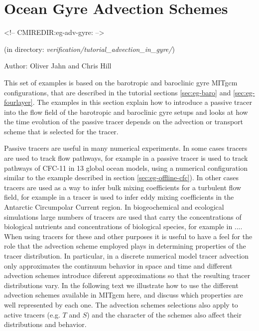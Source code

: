 


\section[Gyre Advection Example]{Ocean Gyre Advection Schemes}
\label{sec:eg-adv-gyre}
\begin{rawhtml}
<!-- CMIREDIR:eg-adv-gyre: -->
\end{rawhtml}
\begin{center} 
(in directory: {\it verification/tutorial\_advection\_in\_gyre/})
\end{center}

Author: Oliver Jahn and Chris Hill



This set of examples is based on the barotropic and baroclinic gyre MITgcm configurations,
that are described in the tutorial sections \ref{sec:eg-baro} and \ref{sec:eg-fourlayer}. 
The examples in this section explain how to introduce a passive tracer into the flow 
field of the barotropic and baroclinic gyre setups and looks at how the time evolution
of the passive tracer depends on the advection or transport scheme that is selected 
for the tracer. 

Passive tracers are useful in many numerical experiments. In some cases tracers are
used to track flow pathways, for example in \cite{Dutay02} a passive tracer is used
to track pathways of CFC-11 in 13 global ocean models, using a numerical
configuration similar to the example described in section \ref{sec:eg-offline-cfc}).
In other cases tracers are used as a way
to infer bulk mixing coefficients for a turbulent flow field, for example in 
\cite{marsh06} a tracer is used to infer eddy mixing coefficients in the
Antarctic Circumpolar Current region. In biogeochemical and ecological simulations large numbers 
of tracers are used that carry the concentrations of biological nutrients and concentrations of 
biological species, for example in ....
When using tracers for these and other purposes it is useful to have a feel for the role
that the advection scheme employed plays in determining properties of the tracer distribution.
In particular, in a discrete numerical model tracer advection only approximates the 
continuum behavior in space and time and different advection schemes introduce diferent 
approximations so that the resulting tracer distributions vary. In the following 
text we illustrate how
to use the different advection schemes available in MITgcm here, and discuss which properties 
are well represented by each one. The advection schemes selections also apply to active
tracers (e.g. $T$ and $S$) and the character of the schemes also affect their distributions
and behavior.

